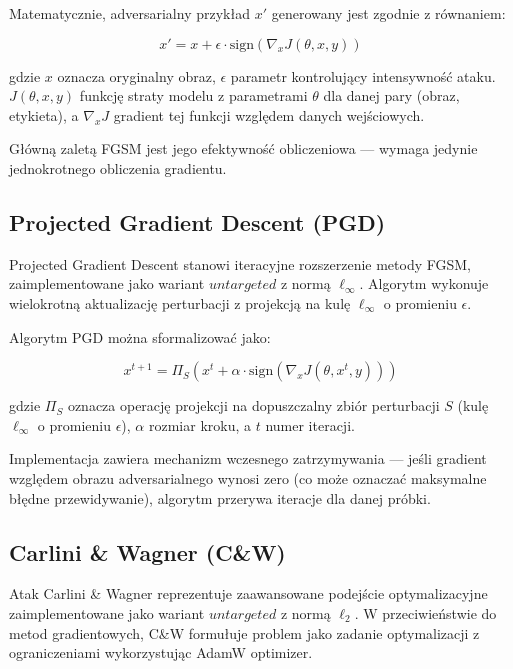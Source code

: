 \documentclass[12pt]{article}
\begin{document}
Matematycznie, adversarialny przykład $x'$ generowany jest zgodnie z równaniem:

\begin{equation}
    x' = x + \epsilon \cdot \text{sign}(\nabla_x J(\theta, x, y))
\end{equation}

gdzie $x$ oznacza oryginalny obraz, $\epsilon$ parametr kontrolujący intensywność ataku. $J(\theta, x, y)$ funkcję straty modelu z parametrami $\theta$ dla danej pary (obraz, etykieta), a $\nabla_x J$ gradient tej funkcji względem danych wejściowych.

Główną zaletą FGSM jest jego efektywność obliczeniowa --- wymaga jedynie jednokrotnego obliczenia gradientu.

\subsection{Projected Gradient Descent (PGD)}

Projected Gradient Descent \supercite{madry2017towards} stanowi iteracyjne rozszerzenie metody FGSM, zaimplementowane jako wariant $untargeted$ z normą $\ell_\infty$. Algorytm wykonuje wielokrotną aktualizację perturbacji z projekcją na kulę $\ell_\infty$ o promieniu $\epsilon$.

Algorytm PGD można sformalizować jako:

\begin{equation}
    x^{t+1} = \Pi_{S}(x^t + \alpha \cdot \text{sign}(\nabla_x J(\theta, x^t, y)))
\end{equation}

gdzie $\Pi_{S}$ oznacza operację projekcji na dopuszczalny zbiór perturbacji $S$ (kulę $\ell_\infty$ o promieniu $\epsilon$), $\alpha$ rozmiar kroku, a $t$ numer iteracji.

Implementacja zawiera mechanizm wczesnego zatrzymywania --- jeśli gradient względem obrazu adversarialnego wynosi zero (co może oznaczać maksymalne błędne przewidywanie), algorytm przerywa iteracje dla danej próbki.

\subsection{Carlini \& Wagner (C\&W)}

Atak Carlini \& Wagner \supercite{carlini2017towards} reprezentuje zaawansowane podejście optymalizacyjne zaimplementowane jako wariant $untargeted$ z normą $\ell_2$. W przeciwieństwie do metod gradientowych, C\&W formułuje problem jako zadanie optymalizacji z ograniczeniami wykorzystując AdamW optimizer.
\end{document}
